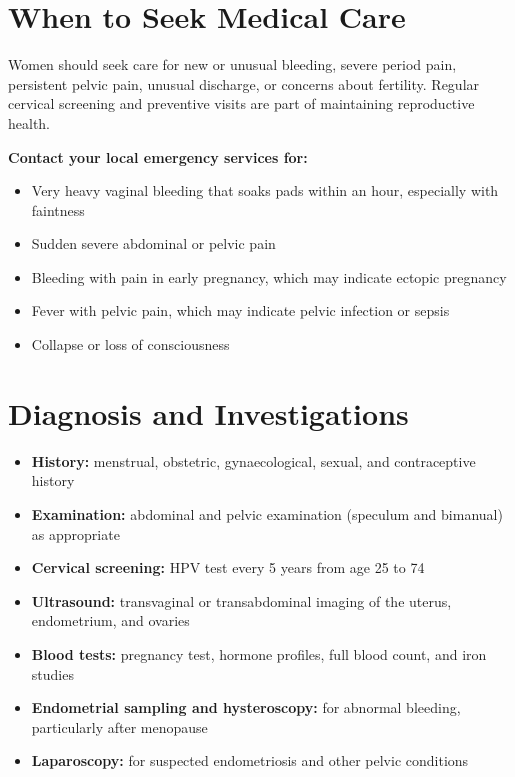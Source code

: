 \section*{When to Seek Medical Care}
Women should seek care for new or unusual bleeding, severe period pain, persistent pelvic pain, unusual discharge, or concerns about fertility. Regular cervical screening and preventive visits are part of maintaining reproductive health.

\textbf{Contact your local emergency services for:}
\begin{itemize}
    \item Very heavy vaginal bleeding that soaks pads within an hour, especially with faintness
    \item Sudden severe abdominal or pelvic pain
    \item Bleeding with pain in early pregnancy, which may indicate ectopic pregnancy
    \item Fever with pelvic pain, which may indicate pelvic infection or sepsis
    \item Collapse or loss of consciousness
\end{itemize}

\section*{Diagnosis and Investigations}
\begin{itemize}
    \item \textbf{History:} menstrual, obstetric, gynaecological, sexual, and contraceptive history
    \item \textbf{Examination:} abdominal and pelvic examination (speculum and bimanual) as appropriate
    \item \textbf{Cervical screening:} HPV test every 5 years from age 25 to 74
    \item \textbf{Ultrasound:} transvaginal or transabdominal imaging of the uterus, endometrium, and ovaries
    \item \textbf{Blood tests:} pregnancy test, hormone profiles, full blood count, and iron studies
    \item \textbf{Endometrial sampling and hysteroscopy:} for abnormal bleeding, particularly after menopause
    \item \textbf{Laparoscopy:} for suspected endometriosis and other pelvic conditions
\end{itemize}

